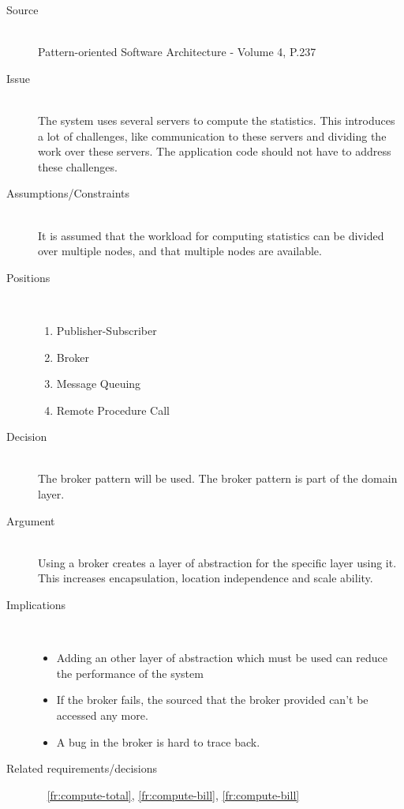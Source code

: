 \begin{description}
\item [Source]~\\
Pattern-oriented Software Architecture - Volume 4, P.237 \cite{wiley-4}

\item [Issue]~\\
The system uses several servers to compute the statistics. This introduces a lot of challenges, like communication to these servers and dividing the work over these servers. The application code should not have to address these challenges.

\item [Assumptions/Constraints]~\\
It is assumed that the workload for computing statistics can be divided over multiple nodes, and that multiple nodes are available.

\item [Positions]~
\begin{enumerate}
\item Publisher-Subscriber
\item Broker 
\item Message Queuing %
\item Remote Procedure Call
\end{enumerate}


\item [Decision]~\\
The broker pattern will be used. The broker pattern is part of the domain layer.

\item [Argument]~\\
Using a broker creates a layer of abstraction for the specific layer using it. This increases encapsulation, location independence and scale ability.

\item [Implications]~\\ 
\begin{itemize}
\item Adding an other layer of abstraction which must be used can reduce the performance of the system
\item If the broker fails, the sourced that the broker provided can't be accessed any more.
\item A bug in the broker is hard to trace back.
\end{itemize}

\item [Related requirements/decisions]~
\ref{fr:compute-total}, \ref{fr:compute-bill}, \ref{fr:compute-bill}
\end{description}

